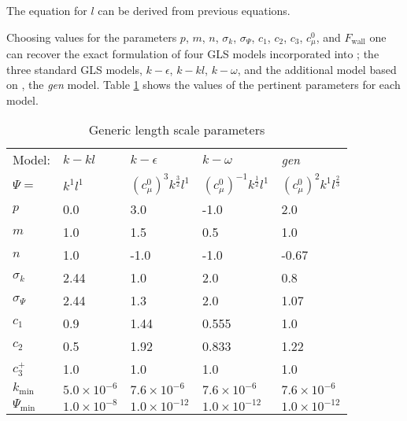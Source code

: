 The equation for $l$ can be derived from previous equations.

Choosing values for the parameters $p$, $m$, $n$, $\sigma_k$, $\sigma_\Psi$, $c_1$, $c_2$, $c_3$, $c_\mu^0$,
and $F_{\mathrm{wall}}$ one can recover the exact formulation of four GLS models incorporated into
\fluidity; the three standard GLS models,
$k-\epsilon$, $k-kl$, $k-\omega$, and the additional model based on \citet{umlauf2003}, 
the \emph{gen} model. Table \ref{tab:glsparams} shows the values of the pertinent parameters for each model.

\begin{table}[b]
\begin{center} 
\begin{tabular}{lllll}\hline
Model: & $k-kl$   & $k-\epsilon$                  & $k-\omega$                       & \emph{gen}       \\ 
$\Psi=$& $k^1l^1$ & $\left(c_\mu^0\right)^3k^{\frac{3}{2}}l^1$ & $\left(c_\mu^0\right)^{-1}k^{\frac{1}{2}}l^1$ & $\left(c_\mu^0\right)^2k^1l^{\frac{2}{3}}$  \\ \hline
$p$                   & 0.0            & 3.0          & -1.0         & 2.0          \\
$m$                   & 1.0            & 1.5          &  0.5         & 1.0          \\
$n$                   & 1.0            & -1.0         & -1.0         & -0.67        \\
$\sigma_k$            & 2.44           & 1.0          & 2.0          & 0.8          \\
$\sigma_\Psi$         & 2.44           & 1.3          & 2.0          & 1.07         \\
$c_1$                 & 0.9            & 1.44         & 0.555        & 1.0          \\
$c_2$                 & 0.5            & 1.92         & 0.833        & 1.22         \\
$c_3^+$               & 1.0            & 1.0          & 1.0          & 1.0          \\
$k_{\mathrm{min}}$    & $5.0\times10^{-6}$    & $7.6\times10^{-6}$  & $7.6\times10^{-6}$  & $7.6\times10^{-6}$  \\
$\Psi_{\mathrm{min}}$ & $1.0\times10^{-8}$    & $1.0\times10^{-12}$ & $1.0\times10^{-12}$ & $1.0\times10^{-12}$ \\
\end{tabular}
\end{center}
\caption{Generic length scale parameters}
\label{tab:glsparams}
\end{table}


